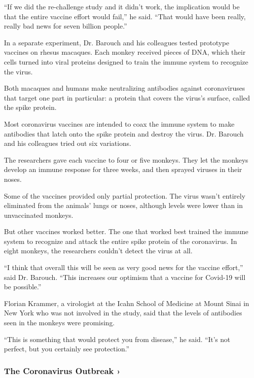 ``If we did the re-challenge study and it didn't work, the implication
would be that the entire vaccine effort would fail,'' he said. ``That
would have been really, really bad news for seven billion people.''

In a separate experiment, Dr. Barouch and his colleagues tested
prototype vaccines on rhesus macaques. Each monkey received pieces of
DNA, which their cells turned into viral proteins designed to train the
immune system to recognize the virus.

Both macaques and humans make neutralizing antibodies against
coronaviruses that target one part in particular: a protein that covers
the virus's surface, called the spike protein.

Most coronavirus vaccines are intended to coax the immune system to make
antibodies that latch onto the spike protein and destroy the virus. Dr.
Barouch and his colleagues tried out six variations.

The researchers gave each vaccine to four or five monkeys. They let the
monkeys develop an immune response for three weeks, and then sprayed
viruses in their noses.

Some of the vaccines provided only partial protection. The virus wasn't
entirely eliminated from the animals' lungs or noses, although levels
were lower than in unvaccinated monkeys.

But other vaccines worked better. The one that worked best trained the
immune system to recognize and attack the entire spike protein of the
coronavirus. In eight monkeys, the researchers couldn't detect the virus
at all.

``I think that overall this will be seen as very good news for the
vaccine effort,'' said Dr. Barouch. ``This increases our optimism that a
vaccine for Covid-19 will be possible.''

Florian Krammer, a virologist at the Icahn School of Medicine at Mount
Sinai in New York who was not involved in the study, said that the
levels of antibodies seen in the monkeys were promising.

``This is something that would protect you from disease,'' he said.
``It's not perfect, but you certainly see protection.''

\href{https://www.nytimes.com/news-event/coronavirus?action=click\&pgtype=Article\&state=default\&region=MAIN_CONTENT_3\&context=storylines_faq}{}

\hypertarget{the-coronavirus-outbreak-}{%
\subsubsection{The Coronavirus Outbreak
›}\label{the-coronavirus-outbreak-}}

